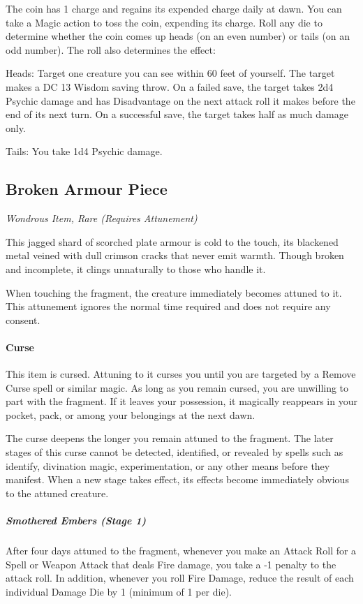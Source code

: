 \documentclass[letterpaper,openany,oneside,twocolumn]{book}
\begin{document}
The coin has 1 charge and regains its expended charge daily at dawn. You can take a Magic action to toss the coin, expending its charge.
Roll any die to determine whether the coin comes up heads (on an even number) or tails (on an odd number).
The roll also determines the effect:

Heads: Target one creature you can see within 60 feet of yourself.
The target makes a DC 13 Wisdom saving throw.
On a failed save, the target takes 2d4 Psychic damage and has Disadvantage on the next attack roll it makes before the end of its next turn.
On a successful save, the target takes half as much damage only.

Tails: You take 1d4 Psychic damage.

\subsection*{Broken Armour Piece}
\textit{Wondrous Item, Rare (Requires Attunement)}\\
{\entryfont This jagged shard of scorched plate armour is cold to the touch, its blackened metal veined with dull crimson cracks that never emit warmth. Though broken and incomplete, it clings unnaturally to those who handle it.

When touching the fragment, the creature immediately becomes attuned to it. This attunement ignores the normal time required and does not require any consent.

\paragraph*{Curse} This item is cursed. Attuning to it curses you until you are targeted by a Remove Curse spell or similar magic. As long as you remain cursed, you are unwilling to part with the fragment. If it leaves your possession, it magically reappears in your pocket, pack, or among your belongings at the next dawn.

The curse deepens the longer you remain attuned to the fragment. The later stages of this curse cannot be detected, identified, or revealed by spells such as identify, divination magic, experimentation, or any other means before they manifest. When a new stage takes effect, its effects become immediately obvious to the attuned creature.

\subparagraph*{Smothered Embers (Stage 1)} After four days attuned to the fragment, whenever you make an Attack Roll for a Spell or Weapon Attack that deals Fire damage, you take a -1 penalty to the attack roll. In addition, whenever you roll Fire Damage, reduce the result of each individual Damage Die by 1 (minimum of 1 per die).}
\end{document}
